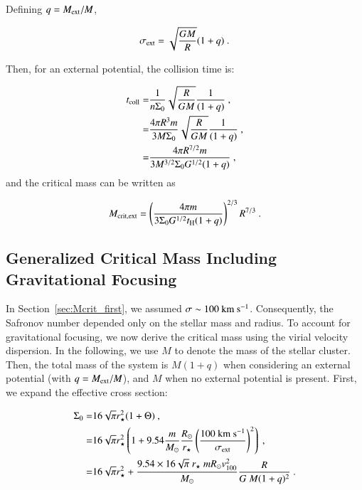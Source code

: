 \begin{appendixs}
	Defining $q=M_{\rm ext}/M$,
	
	\begin{equation}
		\label{eq:disp_vel_ext}
		\sigma_{\rm ext} = \sqrt{\frac{GM}{R}}(1 + q)~.
	\end{equation}
	
	Then, for an external potential, the collision time is:
	
	\begin{align}
		t_{\rm coll} =& \frac{1}{n \Sigma_0}\sqrt{\frac{R}{GM}}\frac{1}{(1 + q)}~,\\
		=& \frac{4\pi R^3m}{3M \Sigma_0}\sqrt{\frac{R}{GM}}\frac{1}{(1 + q)}~,\\
		=& \frac{4\pi R^{7/2}m}{3M^{3/2} \Sigma_0 G^{1/2} (1 + q)}~,
		\label{eq:t_coll_ext}
	\end{align}
	and the critical mass can be written as
	
	\begin{equation}
		M_{\rm crit, ext} = \left(\frac{4 \pi m}{3 \Sigma_0 G^{1/2} t_{\rm H}(1+q)}\right)^{2/3}R^{7/3}~.
	\end{equation}
	
	\subsection{Generalized Critical Mass Including Gravitational Focusing}
	\label{App:Mcrit_generalized}
	
	In Section~\ref{sec:Mcrit_first}, we assumed $\sigma \sim 100~{\rm km}~{\rm s}^{-1}$. Consequently, the Safronov number depended only on the stellar mass and radius. To account for gravitational focusing, we now derive the critical mass using the virial velocity dispersion. In the following, we use $M$ to denote the mass of the stellar cluster. Then, the total mass of the system is $M(1+q)$ when considering an external potential (with $q=M_{\rm ext}/M$), and $M$ when no external potential is present. First, we expand the effective cross section:
	
	\begin{align}
		\Sigma_0 =& 16\sqrt{\pi}r_{\star}^2(1+\Theta) ~,\\
		=& 16\sqrt{\pi}r_{\star}^2\left(1+9.54 \frac{m}{M_{\odot}} \frac{R_{\odot}}{r_{\star}} \left(\frac{100~{\rm km}~{\rm s}^{-1}}{\sigma_{\rm ext}}\right)^2\right) ~,\\
		=& 16\sqrt{\pi} r_\star^2 + \frac{9.54\times16\sqrt{\pi} ~r_\star~ mR_\odot v_{100}^2}{M_\odot} \frac{R}{G~M(1+q)^2}~.
		\label{eq:sigma_eff_expanded}
	\end{align}
	

\end{appendixs}
